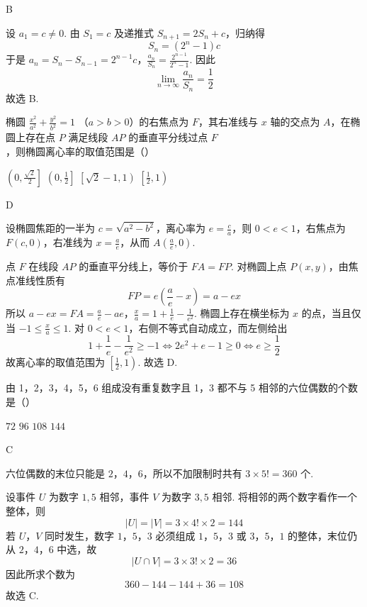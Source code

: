 \begin{answer}
B
\end{answer}

\begin{solution}
设 \(a_1=c\ne0\). 由 \(S_1=c\) 及递推式
\(S_{n+1}=2S_n+c\)，归纳得
\[
S_n=(2^n-1)c
\]
于是
\(a_n=S_n-S_{n-1}=2^{n-1}c\)，\(\frac{a_n}{S_n}=\frac{2^{n-1}}{2^n-1}\).
因此
\[
\lim_{n\to\infty}\frac{a_n}{S_n}=\frac12
\]
故选 B.
\end{solution}

\begin{problem}
椭圆 \(\frac{x^2}{a^2} + \frac{y^2}{b^2} = 1 \) （\(a > b > 0\)）的右焦点为 \(F\)，其右准线与 \(x\) 轴的交点为 \(A\)，在椭圆上存在点 \(P\) 满足线段 \(AP\) 的垂直平分线过点 \(F\)，则椭圆离心率的取值范围是（\quad）

\choices
    {\( \left(0,\frac{\sqrt{2}}{2}\right] \)}
    {\(\left(0, \frac{1}{2}\right]\)}
    {\(\left[\sqrt{2} - 1, 1\right)\)}
    {\( \left[\frac{1}{2},1\right) \)}
\end{problem}

\begin{answer}
D
\end{answer}

\begin{solution}
设椭圆焦距的一半为 \(c=\sqrt{a^2-b^2}\)，离心率为 \(e=\frac ca\)，则 \(0<e<1\)，右焦点为 \(F(c,0)\)，右准线为 \(x=\frac ae\)，从而 \(A\left(\frac ae,0\right)\).

点 \(F\) 在线段 \(AP\) 的垂直平分线上，等价于 \(FA=FP\). 对椭圆上点 \(P(x,y)\)，由焦点准线性质有
\[
FP=e\left(\frac ae-x\right)=a-ex
\]
所以
\(a-ex=FA=\frac ae-ae\)，\(\frac xa=1+\frac1e-\frac1{e^2}\).
椭圆上存在横坐标为 \(x\) 的点，当且仅当 \(-1\leq\frac xa\leq1\). 对 \(0<e<1\)，右侧不等式自动成立，而左侧给出
\[
1+\frac1e-\frac1{e^2}\geq-1
\Longleftrightarrow
2e^2+e-1\geq0
\Longleftrightarrow
e\geq\frac12
\]
故离心率的取值范围为 \(\left[\frac12,1\right)\).
故选 D.
\end{solution}

\begin{problem}
由 1，2，3，4，5，6 组成没有重复数字且 1，3 都不与 5 相邻的六位偶数的个数是（\quad）

\choices
    {\(72\)}
    {\(96\)}
    {\(108\)}
    {\(144\)}
\end{problem}

\begin{answer}
C
\end{answer}

\begin{solution}
六位偶数的末位只能是 \(2\)，\(4\)，\(6\)，所以不加限制时共有 \(3\times5!=360\) 个.

设事件 \(U\) 为数字 \(1,5\) 相邻，事件 \(V\) 为数字 \(3,5\) 相邻. 将相邻的两个数字看作一个整体，则
\[
|U|=|V|=3\times4!\times2=144
\]
若 \(U\)，\(V\) 同时发生，数字 \(1\)，\(5\)，\(3\) 必须组成 \(1\)，\(5\)，\(3\) 或 \(3\)，\(5\)，\(1\) 的整体，末位仍从 \(2\)，\(4\)，\(6\) 中选，故
\[
|U\cap V|=3\times3!\times2=36
\]
因此所求个数为
\[
360-144-144+36=108
\]
故选 C.
\end{solution}

